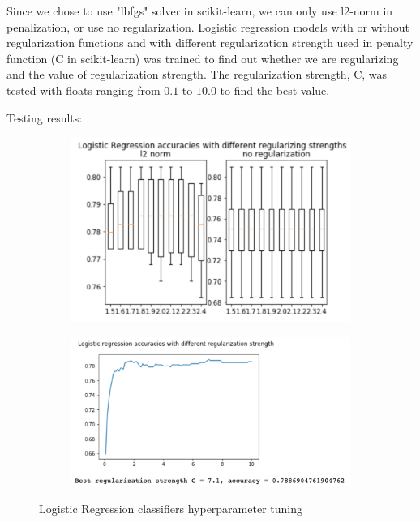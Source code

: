 \documentclass[11.5pt]{article}
\begin{document}
\begin{enumerate}
\begin{itemize}
\begin{enumerate}
                Since we chose to use "lbfgs" solver in scikit-learn, we can only use l2-norm in penalization, or use no regularization.
                Logistic regression models with or without regularization functions and with different regularization strength used in penalty function (C in scikit-learn) was trained to find out whether we are regularizing and the value of regularization strength.
                The regularization strength, C, was tested with floats ranging from $0.1$ to $10.0$ to find the best value.

                Testing results:

                \begin{figure}[h!]
                    \begin{subfigure}[b]{0.5\linewidth}
                        \centering
                        \includegraphics[width=\linewidth]{images/log_reg_hyperparam_penalty.png}
                    \end{subfigure}
                    \begin{subfigure}[b]{0.5\linewidth}
                        \centering
                        \includegraphics[width=\linewidth]{images/log_reg_hyperparam_c.png}
                    \end{subfigure}
                    \caption{Logistic Regression classifiers hyperparameter tuning}
                \end{figure}






\end{enumerate}
\end{itemize}
\end{enumerate}
\end{document}
